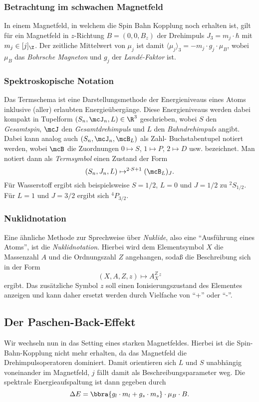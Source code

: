 \documentclass{subfiles}
\begin{document}

    \subsubsection*{Betrachtung im schwachen Magnetfeld}
        In einem Magnetfeld, in welchem die Spin Bahn Kopplung noch erhalten ist, gilt für ein Magnetfeld in $z$-Richtung $B = (0,0,B_z)$ der Drehimpuls $J_3 = m_j\cdot\hbar$ mit $m_j\in[j]_\Z$. Der zeitliche Mittelwert von $\mu_j$ ist damit $\langle\mu_j\rangle_3 = -m_j\cdot g_j\cdot\mu_B$, wobei $\mu_B$ das \emph{Bohrsche Magneton} und $g_j$ der \emph{Landé-Faktor} ist. 
        
    \subsubsection*{Spektroskopische Notation}
        Das Termschema ist eine Darstellungsmethode der Energieniveaus eines Atoms inklusive (aller) erlaubten Energieübergänge. Diese Energieniveaus werden dabei kompakt in Tupelform $(S_n,\mcJ_n,L)\in\R^3$ geschrieben, wobei $S$ den \emph{Gesamtspin}, $\mcJ$ den \emph{Gesamtdrehimpuls} und $L$ den \emph{Bahndrehimpuls} angibt. Dabei kann analog auch $(S_n,\mcJ_n,\mcB_L)$ als Zahl- Buchstabentupel notiert werden, wobei $\mcB$ die Zuordnungen $0\mapsto S$, $1\mapsto P$, $2\mapsto D$ usw. bezeichnet. Man notiert dann als \emph{Termsymbol} einen Zustand der Form
        \[
            (S_n,J_n,L) \mapsto ^{2\cdot S + 1}(\mcB_L)_J. 
        \]
        Für Wasserstoff ergibt sich beispielsweise $S = 1/2$, $L = 0$ und $J = 1/2$ zu $^2S_{1/2}$. Für $L = 1$ und $J = 3/2$ ergibt sich $^4P_{3/2}$.

    \subsubsection*{Nuklidnotation}
        Eine ähnliche Methode zur Sprechweise über \emph{Nuklide}, also eine \enquote{Ausführung eines Atoms}, ist die \emph{Nuklidnotation}. Hierbei wird dem Elementsymbol $X$ die Massenzahl $A$ und die Ordnungszahl $Z$ angehangen, sodaß die Beschreibung sich in der Form
        \[
            (X,A,Z,z)\mapsto A^Z_X^z
        \]
        ergibt. Das zusätzliche Symbol $z$ soll einen Ionisierungszustand des Elementes anzeigen und kann daher ersetzt werden durch Vielfache von \enquote{+} oder \enquote{-}.  

    \subsection{Der Paschen-Back-Effekt}
        Wir wechseln nun in das Setting eines starken Magnetfeldes. Hierbei ist die Spin-Bahn-Kopplung nicht mehr erhalten, da das Magnetfeld die Drehimpulsoperatoren dominiert. Damit orientieren sich $L$ und $S$ unabhängig voneinander im Magnetfeld, $j$ fällt damit als Beschreibungsparameter weg. Die spektrale Energieaufspaltung ist dann gegeben durch
        \[
            \Delta E = \bbra{g_l\cdot m_l + g_s\cdot m_s}\cdot\mu_B\cdot B.
        \]
        

    
\end{document}
